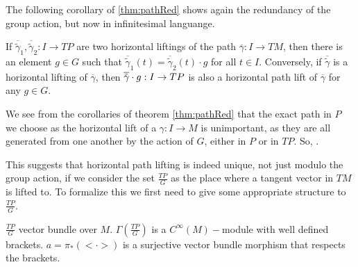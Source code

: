 The following corollary of \ref{thm:pathRed} shows again the redundancy of the group action, but now in infinitesimal languange.

\begin{corollary}
If $\overline{\tilde{\gamma}}_1, \overline{\tilde{\gamma}}_2: I \to TP$ are two horizontal liftings of the path $\overline{\gamma}:I \to TM$, then there is an element $g \in G$ such that $\overline{\tilde{\gamma}}_1 (t) = \overline{\tilde{\gamma}}_2 (t) \cdot g$ for all $t \in I$. Conversely, if $\overline{\tilde{\gamma}}$ is a horizontal lifting of $\overline{\gamma}$, then $\overline{\Tilde{\gamma}}\cdot g :I \to TP$ is also a horizontal path lift of $\overline{\gamma}$ for any $g\in G$.%
\end{corollary}

We see from the corollaries of theorem \ref{thm:pathRed} that the exact path in $P$ we choose as the horizontal lift of a $\gamma:I \to M$ is unimportant, as they are all generated from one another by the action of $G$, either in $P$ or in $TP$. So, .

This suggests that horizontal path lifting is indeed unique, not just modulo the group action, if we consider the set $\frac{TP}{G}$ as the place where a tangent vector in $TM$ is lifted to. To formalize this we first need to give some appropriate structure to $\frac{TP}{G}$.

\begin{definition}
$\frac{TP}{G}$ vector bundle over $M$. $\Gamma(\frac{TP}{G})$ is a $C^\infty(M)-$module with well defined brackets. $a = \pi_{*}(<\cdot>)$ is a surjective vector bundle morphism that respects the brackets.  
\end{definition}

